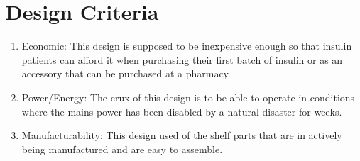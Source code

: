 \section{Design Criteria}
\begin{enumerate}
  \item Economic: This design is supposed to be inexpensive enough so that insulin patients can afford it when purchasing their first batch of insulin or as an accessory that can be purchased at a pharmacy.
  \item Power/Energy: The crux of this design is to be able to operate in conditions where the mains power has been disabled by a natural disaster for weeks.
  \item Manufacturability: This design used of the shelf parts that are in actively being manufactured and are easy to assemble.
\end{enumerate}
